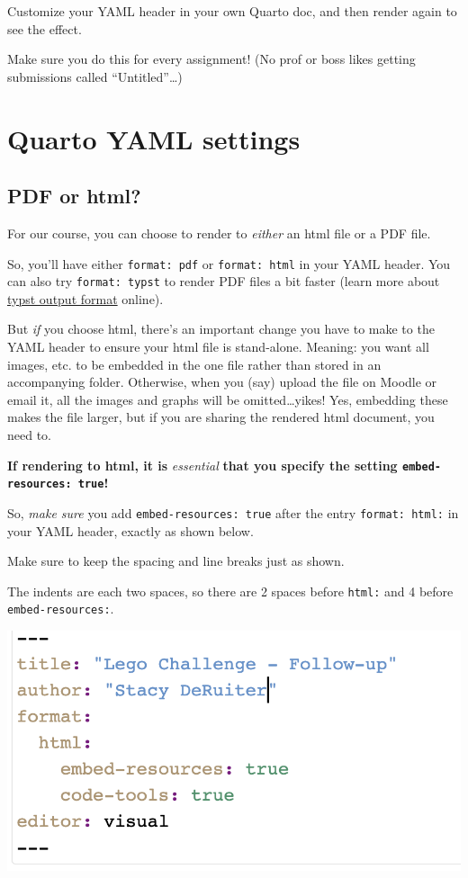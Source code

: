 \documentclass[
  letterpaper,
  DIV=11,
  numbers=noendperiod]{scrreprt}
\theoremstyle{remark}
\begin{document}
Customize your YAML header in your own Quarto doc, and then render again
to see the effect.

Make sure you do this for every assignment! (No prof or boss likes
getting submissions called ``Untitled''\ldots)

\section{Quarto YAML settings}\label{quarto-yaml-settings}

\subsection{PDF or html?}\label{pdf-or-html}

For our course, you can choose to render to \emph{either} an html file
or a PDF file.

So, you'll have either \texttt{format:\ pdf} or \texttt{format:\ html}
in your YAML header. You can also try \texttt{format:\ typst} to render
PDF files a bit faster (learn more about
\href{https://quarto.org/docs/output-formats/typst.html}{typst output
format} online).

But \emph{if} you choose html, there's an important change you have to
make to the YAML header to ensure your html file is stand-alone.
Meaning: you want all images, etc. to be embedded in the one file rather
than stored in an accompanying folder. Otherwise, when you (say) upload
the file on Moodle or email it, all the images and graphs will be
omitted\ldots yikes! Yes, embedding these makes the file larger, but if
you are sharing the rendered html document, you need to.

\textbf{If rendering to html, it is} \emph{essential} \textbf{that you
specify the setting \texttt{embed-resources:\ true}!}

So, \emph{make sure} you add \texttt{embed-resources:\ true} after the
entry \texttt{format:\ html:} in your YAML header, exactly as shown
below.

Make sure to keep the spacing and line breaks just as shown.

The indents are each two spaces, so there are 2 spaces before
\texttt{html:} and 4 before \texttt{embed-resources:}.

\includegraphics[width=0.75\linewidth,height=\textheight,keepaspectratio]{images/embed.png}
\end{document}
